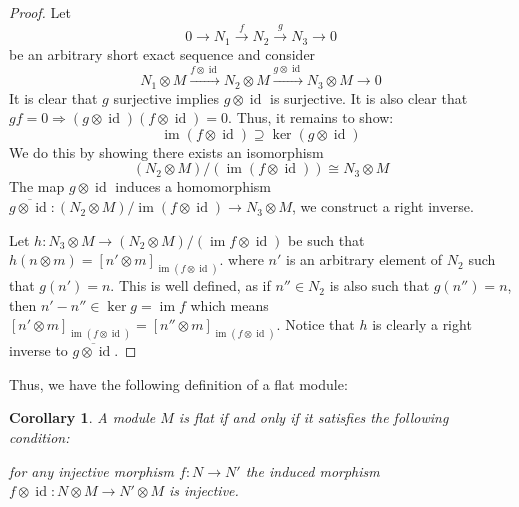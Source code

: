 \documentclass[12pt]{article}
\theoremstyle{plain}
\newtheorem{cor}[thm]{Corollary}
\theoremstyle{definition}
\newcommand{\lto}{\longrightarrow}
\begin{document}
\begin{proof}
Let
\begin{equation}
0 \lto N_1 \stackrel{f}{\lto} N_2 \stackrel{g}{\lto} N_3 \lto 0
\end{equation}
be an arbitrary short exact sequence and consider
\begin{equation}
N_1 \otimes M \stackrel{f \otimes \operatorname{id}}{\lto} N_2 \otimes M \stackrel{g \otimes \operatorname{id}}{\lto}N_3 \otimes M \lto 0
\end{equation}
It is clear that $g$ surjective implies $g \otimes \operatorname{id}$ is surjective.  It is also clear that $gf = 0 \Rightarrow (g \otimes \operatorname{id})(f \otimes \operatorname{id}) = 0$. Thus, it remains to show:
\begin{equation}
\operatorname{im}(f \otimes \operatorname{id}) \supseteq\operatorname{ker}(g \otimes \operatorname{id})
\end{equation}
We do this by showing there exists an isomorphism
\begin{equation}
(N_2 \otimes M)/(\operatorname{im}(f \otimes \operatorname{id}))\cong N_3 \otimes M
\end{equation}
The map $g \otimes \operatorname{id}$ induces a homomorphism $\overline{g \otimes \operatorname{id}}: (N_2 \otimes M)/\operatorname{im}(f \otimes \operatorname{id}) \lto N_3 \otimes M$, we construct a right inverse.

Let $h: N_3 \otimes M \lto (N_2 \otimes M)/(\operatorname{im}f \otimes \operatorname{id})$ be such that $h(n \otimes m) = [n' \otimes m]_{\operatorname{im}(f \otimes \operatorname{id})}$. where $n'$ is an arbitrary element of $N_2$ such that $g(n') = n$. This is well defined, as if $n'' \in N_2$ is also such that $g(n'') = n$, then $n' - n'' \in \operatorname{ker}g = \operatorname{im}f$ which means $[n' \otimes m]_{\operatorname{im}(f \otimes \operatorname{id})} = [n'' \otimes m]_{\operatorname{im}(f \otimes \operatorname{id})}$. Notice that $h$ is clearly a right inverse to $\overline{g \otimes \operatorname{id}}$.
\end{proof}
Thus, we have the following definition of a flat module:
\begin{cor}
A module $M$ is flat if and only if it satisfies the following condition:

for any injective morphism $f: N \lto N'$ the induced morphism $f \otimes \operatorname{id}: N \otimes M \lto N' \otimes M$ is injective.
\end{cor}
\end{document}
